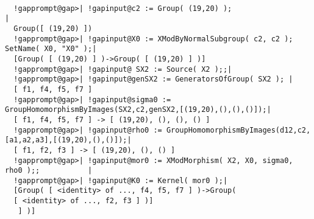 \documentclass[a4paper,11pt]{report}
\begin{document}
{{ 

 
\begin{Verbatim}[commandchars=!@|,fontsize=\small,frame=single,label=Example]
  
  !gapprompt@gap>| !gapinput@c2 := Group( (19,20) );                                    |
  Group([ (19,20) ])
  !gapprompt@gap>| !gapinput@X0 := XModByNormalSubgroup( c2, c2 );  SetName( X0, "X0" );|
  [Group( [ (19,20) ] )->Group( [ (19,20) ] )]
  !gapprompt@gap>| !gapinput@ SX2 := Source( X2 );;|
  !gapprompt@gap>| !gapinput@genSX2 := GeneratorsOfGroup( SX2 ); |
  [ f1, f4, f5, f7 ]
  !gapprompt@gap>| !gapinput@sigma0 := GroupHomomorphismByImages(SX2,c2,genSX2,[(19,20),(),(),()]);|
  [ f1, f4, f5, f7 ] -> [ (19,20), (), (), () ]
  !gapprompt@gap>| !gapinput@rho0 := GroupHomomorphismByImages(d12,c2,[a1,a2,a3],[(19,20),(),()]);|
  [ f1, f2, f3 ] -> [ (19,20), (), () ]
  !gapprompt@gap>| !gapinput@mor0 := XModMorphism( X2, X0, sigma0, rho0 );;           |
  !gapprompt@gap>| !gapinput@K0 := Kernel( mor0 );|
  [Group( [ <identity> of ..., f4, f5, f7 ] )->Group( 
  [ <identity> of ..., f2, f3 ] )]
   ] )]
\end{Verbatim}
 }

 }

         
\end{document}
